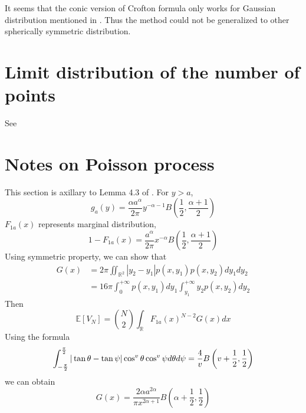 \documentclass{article}
\def\E{\mathbb{E}}
\def\R{\mathbb{R}}
\begin{document}
It seems that the conic version of Crofton formula only
works for Gaussian distribution mentioned in \cite{kabluchko2020absorption}.
Thus the method could not be generalized to
other spherically symmetric distribution.
\section{Limit distribution of the number of points}
See \cite{aldous1991number}
\section{Notes on Poisson process}
This section is axillary to Lemma 4.3 of \cite{davis1987convex}.
For $y>a$,
\begin{equation}
    g_a(y) = \frac{\alpha a^{\alpha}}{2\pi}
    y^{-\alpha-1} B(\frac{1}{2}, \frac{\alpha + 1}{2})
\end{equation}
$F_{1a}(x)$ represents marginal distribution,
\begin{equation}
    1-F_{1a}(x)=\frac{a^{\alpha}}{2\pi}x^{-\alpha}B(\frac{1}{2}, \frac{\alpha + 1}{2})
\end{equation}
Using symmetric property, we can show that
\begin{align}
G(x) &= 2\pi \iint_{\R^2} |y_2 - y_1| p(x,y_1) p(x,y_2)dy_1dy_2\\
&=16\pi \int_0^{+\infty} p(x,y_1) dy_1 \int_{y_1}^{+\infty} y_2 p(x,y_2)dy_2
\end{align}
Then
\begin{equation}
    \E[V_N]= \binom{N}{2} \int_{\R} F_{1a}(x)^{N-2} G(x) dx
\end{equation}
Using the formula
\begin{equation}
    \int_{-\frac{\pi}{2}}^{\frac{\pi}{2}}
    |\tan \theta - \tan \psi|
    \cos^v\theta \cos^v \psi
    d\theta d\psi \notag\\
    = \frac{4}{v} B\left(v+\frac{1}{2}, \frac{1}{2}
    \right)
\end{equation}
we can obtain
\begin{equation}
    G(x) = \frac{2\alpha a^{2\alpha}}{\pi x^{2\alpha+1}}
    B(\alpha+\frac{1}{2},\frac{1}{2})
\end{equation}


\end{document}
